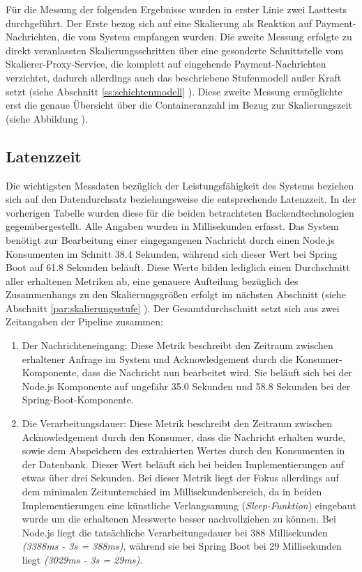 Für die Messung der folgenden Ergebnisse wurden in erster Linie zwei Lasttests durchgeführt. Der Erste bezog sich auf eine Skalierung als Reaktion auf Payment-Nachrichten, die vom System empfangen wurden. Die zweite Messung erfolgte zu direkt veranlassten Skalierungsschritten über eine gesonderte Schnittstelle vom Skalierer-Proxy-Service, die komplett auf eingehende Payment-Nachrichten verzichtet, dadurch allerdings auch das beschriebene Stufenmodell außer Kraft setzt (siehe Abschnitt \ref{ss:schichtenmodell} ). Diese zweite Messung ermöglichte erst die genaue Übersicht über die Containeranzahl im Bezug zur Skalierungszeit (siehe Abbildung ).


\subsection{Latenzzeit}
Die wichtigsten Messdaten bezüglich der Leistungsfähigkeit des Systems beziehen sich auf den Datendurchsatz beziehungsweise die entsprechende Latenzzeit. In der vorherigen Tabelle wurden diese für die beiden betrachteten Backendtechnologien gegenübergestellt. Alle Angaben wurden in Millisekunden erfasst. Das System benötigt zur Bearbeitung einer eingegangenen Nachricht durch einen Node.js Konsumenten im Schnitt 38.4 Sekunden, während sich dieser Wert bei Spring Boot auf 61.8 Sekunden beläuft. Diese Werte bilden lediglich einen Durchschnitt aller erhaltenen Metriken ab, eine genauere Aufteilung bezüglich des Zusammenhangs zu den Skalierungsgrößen erfolgt im nächsten Abschnitt (siehe Abschnitt \ref{par:skalierungsstufe} ). Der Gesamtdurchschnitt setzt sich aus zwei Zeitangaben der Pipeline zusammen: 

\begin{enumerate}
  \item Der Nachrichteneingang: Diese Metrik beschreibt den Zeitraum zwischen erhaltener Anfrage im System und Acknowledgement durch die Konsumer-Komponente, dass die Nachricht nun bearbeitet wird. Sie beläuft sich bei der Node.js Komponente auf ungefähr 35.0 Sekunden und 58.8 Sekunden bei der Spring-Boot-Komponente. 
  \item Die Verarbeitungsdauer: Diese Metrik beschreibt den Zeitraum zwischen Acknowledgement durch den Konsumer, dass die Nachricht erhalten wurde, sowie dem Abspeichern des extrahierten Wertes durch den Konsumenten in der Datenbank. Dieser Wert beläuft sich bei beiden Implementierungen auf etwas über drei Sekunden. Bei dieser Metrik liegt der Fokus allerdings auf dem minimalen Zeitunterschied im Millisekundenbereich, da in beiden Implementierungen eine künstliche Verlangsamung (\emph{Sleep-Funktion}) eingebaut wurde um die erhaltenen Messwerte besser nachvollziehen zu können. Bei Node.js liegt die tatsächliche Verarbeitungsdauer bei 388 Millisekunden \emph{(3388ms - 3s = 388ms)}, während sie bei Spring Boot bei 29 Millisekunden liegt \emph{(3029ms - 3s = 29ms)}.
\end{enumerate}

